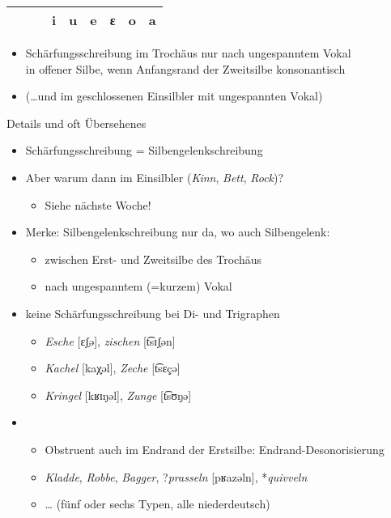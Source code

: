 \begin{frame}
{\begin{tabular}{lllllllll}
      \midrule
      & & & \textbf{i} & \textbf{u} & \textbf{e} & \textbf{ε} & \textbf{o} & \textbf{a} \\

      \bottomrule
    \end{tabular}
  }
  \Halbzeile\pause
  \begin{itemize}[<+->]
    \item \alert{Schärfungsschreibung im Trochäus nur nach ungespanntem Vokal\\
      in offener Silbe, wenn Anfangsrand der Zweitsilbe konsonantisch}
    \item (\ldots und im geschlossenen Einsilbler mit ungespannten Vokal)
  \end{itemize}
\end{frame}

\begin{frame}
  {Details und oft Übersehenes}
  \pause
  \begin{itemize}[<+->]
    \item \alert{Schärfungsschreibung = Silbengelenkschreibung}
    \item Aber warum dann im Einsilbler (\textit{Kinn}, \textit{Bett}, \textit{Rock})?
      \begin{itemize}[<+->]
        \item Siehe nächste Woche!
      \end{itemize}
      \Halbzeile
    \item Merke: Silbengelenkschreibung nur da, wo auch Silbengelenk:
      \begin{itemize}[<+->]
        \item \alert{zwischen Erst- und Zweitsilbe des Trochäus}
        \item \alert{nach ungespanntem} (=kurzem) \alert{Vokal}
      \end{itemize}
      \Halbzeile
    \item \alert{keine Schärfungsschreibung bei Di- und Trigraphen}
      \begin{itemize}[<+->]
        \item \textit{Esche} [ɛʃ̣ə], \textit{zischen} [t͡sɪʃ̣ən]
        \item \textit{Kachel} [kaχ̣əl], \textit{Zeche} [t͡sɛç̣ə]
        \item \textit{Kringel} [kʁɪŋ̣əl], \textit{Zunge} [t͡sʊŋ̣ə]
      \end{itemize}
      \Halbzeile
    \item {}
      \begin{itemize}[<+->]
        \item Obstruent auch im Endrand der Erstsilbe: \alert{Endrand-Desonorisierung}
        \item \textit{Kladde}, \textit{Robbe}, \textit{Bagger}, ?\textit{prasseln} [pʁazəln], *\textit{quivveln}
        \item \ldots {} (fünf oder sechs Typen, alle niederdeutsch)
      \end{itemize}
  \end{itemize}
\end{frame}

